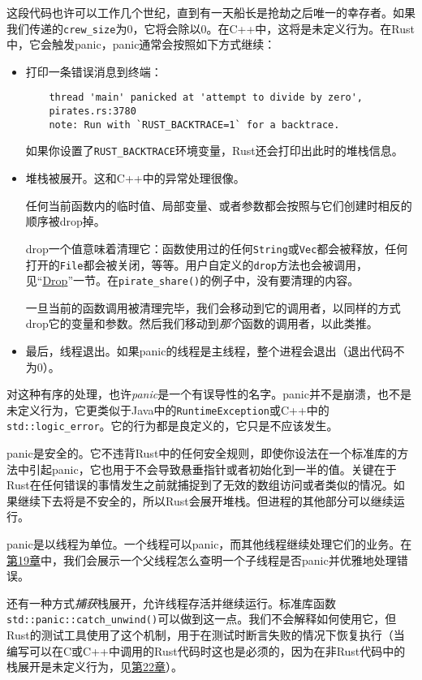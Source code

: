 这段代码也许可以工作几个世纪，直到有一天船长是抢劫之后唯一的幸存者。如果我们传递的\texttt{crew\_size}为0，它将会除以0。在C++中，这将是未定义行为。在Rust中，它会触发panic，panic通常会按照如下方式继续：
\begin{itemize}
    \item 打印一条错误消息到终端：
    \begin{verbatim}
    thread 'main' panicked at 'attempt to divide by zero',
    pirates.rs:3780
    note: Run with `RUST_BACKTRACE=1` for a backtrace.
    \end{verbatim}

    如果你设置了\texttt{RUST\_BACKTRACE}环境变量，Rust还会打印出此时的堆栈信息。

    \item 堆栈被展开。这和C++中的异常处理很像。
    
    任何当前函数内的临时值、局部变量、或者参数都会按照与它们创建时相反的顺序被drop掉。

    drop一个值意味着清理它：函数使用过的任何\texttt{String}或\texttt{Vec}都会被释放，任何打开的\texttt{File}都会被关闭，等等。用户自定义的\texttt{drop}方法也会被调用，见“\hyperref[drop]{Drop}”一节。在\texttt{pirate\_share()}的例子中，没有要清理的内容。

    一旦当前的函数调用被清理完毕，我们会移动到它的调用者，以同样的方式drop它的变量和参数。然后我们移动到\emph{那个}函数的调用者，以此类推。

    \item 最后，线程退出。如果panic的线程是主线程，整个进程会退出（退出代码不为0）。
\end{itemize}

对这种有序的处理，也许\emph{panic}是一个有误导性的名字。panic并不是崩溃，也不是未定义行为，它更类似于Java中的\texttt{RuntimeException}或C++中的\texttt{std::logic\_error}。它的行为都是良定义的，它只是不应该发生。

panic是安全的。它不违背Rust中的任何安全规则，即使你设法在一个标准库的方法中引起panic，它也用于不会导致悬垂指针或者初始化到一半的值。关键在于Rust在任何错误的事情发生之前就捕捉到了无效的数组访问或者类似的情况。如果继续下去将是不安全的，所以Rust会展开堆栈。但进程的其他部分可以继续运行。

panic是以线程为单位。一个线程可以panic，而其他线程继续处理它们的业务。在\hyperref[ch19]{第19章}中，我们会展示一个父线程怎么查明一个子线程是否panic并优雅地处理错误。

还有一种方式\emph{捕获}栈展开，允许线程存活并继续运行。标准库函数\\
\texttt{std::panic::catch\_unwind()}可以做到这一点。我们不会解释如何使用它，但Rust的测试工具使用了这个机制，用于在测试时断言失败的情况下恢复执行（当编写可以在C或C++中调用的Rust代码时这也是必须的，因为在非Rust代码中的栈展开是未定义行为，见\hyperref[ch22]{第22章}）。

